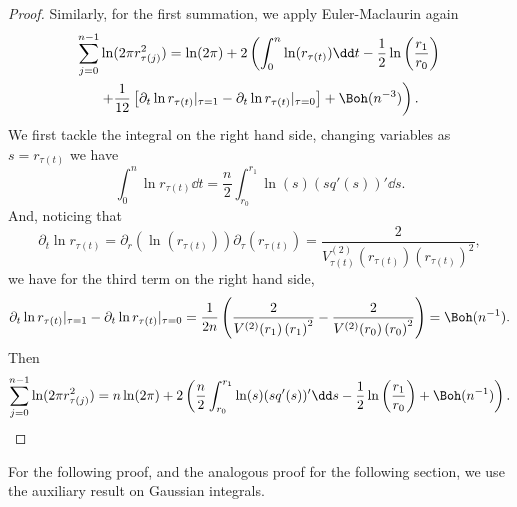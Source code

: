 \begin{proof}
	Similarly, for the first summation, we apply Euler-Maclaurin again
	\begin{multline}
		\sum_{j=0}^{n-1}  \ln(2 \pi r^2_{\tau(j)}) = \ln(2\pi) + 2 \left( \int_{0}^{n} \ln(r_{\tau(t)})  \dd t - \frac{1}{2} \ln\left(\frac{r_1}{r_0}\right) \right. \\ \left. + \frac{1}{12} \left[ \partial_t \ln r_{\tau(t)} |_{\tau=1} - \partial_t \ln r_{\tau(t)} |_{\tau=0}\right] + \Boh(n^{-3}) \right).
	\end{multline}
	We first tackle the integral on the right hand side, changing variables as $s = r_{\tau(t)}$ we have
	\begin{equation}
		\int_{0}^{n} \ln r_{\tau(t)} \dd t = \frac{n}{2} \int_{r_0}^{r_1} \ln(s) (s q'(s))' \dd s.
	\end{equation}
	And, noticing that
	\begin{equation}
		\partial_t \ln r_{\tau(t)} =  \partial_r \left( \ln(r_{\tau(t)}) \right) \partial_\tau \left( r_{\tau(t)} \right) = \frac{2}{V^{(2)}_{\tau(t)}(r_{\tau(t)}) \left( r_{\tau(t)} \right)^2},
	\end{equation}
	we have for the third term on the right hand side, 
	\begin{align}
		\partial_t \ln  r_{\tau(t)} |_{\tau=1} - \partial_t \ln  r_{\tau(t)}  |_{\tau=0}  = \frac{1}{2n} \left( \frac{2}{V^{(2)}(r_{1}) \left( r_{1} \right)^2} - \frac{2}{V^{(2)}(r_{0}) \left( r_{0} \right)^2} \right) = \Boh(n^{-1}).
	\end{align}
	Then
	\begin{equation}
		\sum_{j=0}^{n-1}  \ln(2\pi r^2_{\tau(j)}) = n \ln(2\pi) + 2 \left( \frac{n}{2} \int_{r_0}^{r_1} \ln(s) (s q'(s))' \dd s - \frac{1}{2} \ln\left(\frac{r_1}{r_0}\right) + \Boh(n^{-1}) \right) .
		\label{Equation: log(r) annulus}
	\end{equation}
\end{proof}

For the following proof, and the analogous proof for the following section, we use the auxiliary result on Gaussian integrals.


